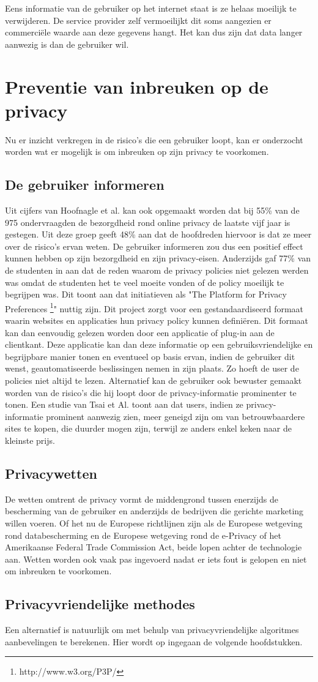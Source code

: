 Eens informatie van de gebruiker op het internet staat is ze helaas moeilijk te verwijderen. De service provider zelf vermoeilijkt dit soms aangezien er commerci\"ele waarde aan deze gegevens hangt. Het kan dus zijn dat data langer aanwezig is dan de gebruiker wil.


\section{Preventie van inbreuken op de privacy}
Nu er inzicht verkregen in de risico's die een gebruiker loopt, kan er onderzocht worden wat er mogelijk is om inbreuken op zijn privacy te voorkomen.

\subsection{De gebruiker informeren}

Uit cijfers van Hoofnagle et al. \cite{hoofnagle} kan ook opgemaakt worden dat bij 55\% van de 975 ondervraagden de bezorgdheid rond online privacy de laatste vijf jaar is gestegen. Uit deze groep geeft 48\% aan dat de hoofdreden hiervoor is dat ze meer over de risico's ervan weten. De gebruiker informeren zou dus een positief effect kunnen hebben op zijn bezorgdheid en zijn privacy-eisen. Anderzijds gaf 77\% van de studenten in \cite{privdisc} aan dat de reden waarom de privacy policies niet gelezen werden was omdat de studenten het te veel moeite vonden of de policy moeilijk te begrijpen was. Dit toont aan dat initiatieven als "The Platform for Privacy Preferences \footnote{http://www.w3.org/P3P/}" nuttig zijn. Dit project zorgt voor een gestandaardiseerd formaat waarin websites en applicaties hun privacy policy kunnen defini\"eren. Dit formaat kan dan eenvoudig gelezen worden door een applicatie of plug-in aan de clientkant. Deze applicatie kan dan deze informatie op een gebruiksvriendelijke en begrijpbare manier tonen en eventueel op basis ervan, indien de gebruiker dit wenst, geautomatiseerde beslissingen nemen in zijn plaats. Zo hoeft de user de policies niet altijd te lezen. Alternatief kan de gebruiker ook bewuster gemaakt worden van de risico's die hij loopt door de privacy-informatie prominenter te tonen. Een studie van Tsai et Al. \cite{tsaitsai} toont aan dat users, indien ze privacy-informatie prominent aanwezig zien, meer geneigd zijn om van betrouwbaardere sites te kopen, die duurder mogen zijn, terwijl ze anders enkel keken naar de kleinste prijs. 

\subsection{Privacywetten}
De wetten omtrent de privacy vormt de middengrond tussen enerzijds de bescherming van de gebruiker en anderzijds de bedrijven die gerichte marketing willen voeren. Of het nu de Europese richtlijnen zijn als de Europese wetgeving rond databescherming en de Europese wetgeving rond de e-Privacy of het Amerikaanse Federal Trade Commission Act, beide lopen achter de technologie aan. Wetten worden ook vaak pas ingevoerd  nadat er iets fout is gelopen en niet om inbreuken te voorkomen.

\subsection{Privacyvriendelijke methodes}
Een alternatief is natuurlijk om met behulp van privacyvriendelijke algoritmes aanbevelingen te berekenen. Hier wordt op ingegaan de volgende hoofdstukken.

